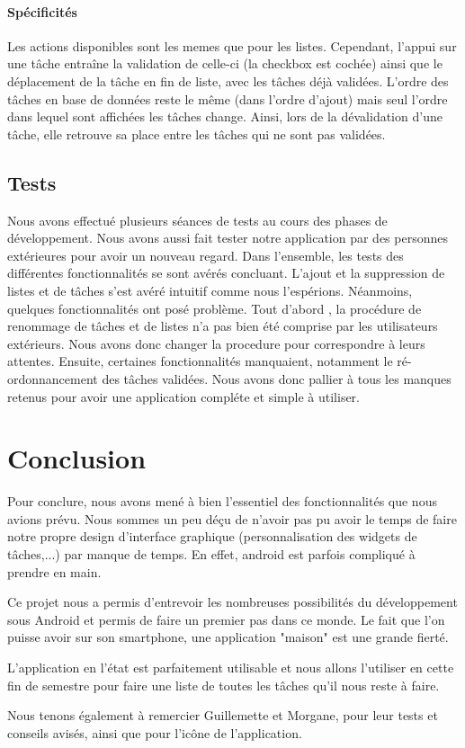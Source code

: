 \documentclass[a4paper, 11pt, french]{report}
\begin{document}
	\subsubsection{Spécificités}
	Les actions disponibles sont les memes que pour les listes. Cependant, l'appui sur une tâche entraîne la validation de celle-ci (la checkbox est cochée) ainsi que le déplacement de la tâche en fin de liste, avec les tâches déjà validées.
	L'ordre des tâches en base de données reste le même (dans l'ordre d'ajout) mais seul l'ordre dans lequel sont affichées les tâches change. Ainsi, lors de la dévalidation d'une tâche, elle retrouve sa place entre les tâches qui ne sont pas validées.



\section{Tests}
Nous avons effectué plusieurs séances de tests au cours des phases de développement. Nous avons aussi fait tester notre application par des personnes extérieures pour avoir un nouveau regard. Dans l'ensemble, les tests des différentes fonctionnalités se sont avérés concluant. 
L'ajout et la suppression de listes et de tâches s'est avéré intuitif comme nous l'espérions. 
Néanmoins, quelques fonctionnalités ont posé problème. 
Tout d'abord , la procédure de renommage de tâches et de listes n'a pas bien été comprise par les utilisateurs extérieurs. Nous avons donc changer la procedure pour correspondre à leurs attentes.
Ensuite, certaines fonctionnalités manquaient, notamment le ré-ordonnancement des tâches validées. Nous avons donc pallier à tous les manques retenus pour avoir une application compléte et simple à utiliser.


\chapter{Conclusion} 
Pour conclure, nous avons mené à bien l'essentiel des fonctionnalités que nous avions prévu. Nous sommes un peu déçu de n'avoir pas pu avoir le temps de faire notre propre design d'interface graphique (personnalisation des widgets de tâches,...) par manque de temps. En effet, android est parfois compliqué à prendre en main.
\newline

Ce projet nous a permis d'entrevoir les nombreuses possibilités du développement sous Android et permis de faire un premier pas dans ce monde. Le fait que l'on puisse avoir sur son smartphone, une application "maison" est une grande fierté. 

L'application en l'état est parfaitement utilisable et nous allons l'utiliser en cette fin de semestre pour faire une liste de toutes les tâches qu'il nous reste à faire.
\newline

Nous tenons également à remercier Guillemette et Morgane, pour leur tests et conseils avisés, ainsi que pour l'icône de l'application.
\end{document}
